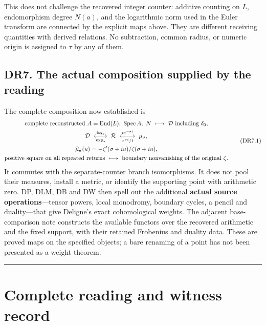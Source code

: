 \documentclass[
]{report}
\begin{document}
This does not challenge the recovered integer counter: additive counting
on \(L\), endomorphism degree \(N(a)\), and the logarithmic norm used in
the Euler transform are connected by the explicit maps above. They are
different receiving quantities with derived relations. No subtraction,
common radius, or numeric origin is assigned to \(\tau\) by any of them.

\section{DR7. The actual composition supplied by the
reading}\label{dr7.-the-actual-composition-supplied-by-the-reading}

The complete composition now established is \[
\begin{gathered}
\text{complete reconstructed }A=\operatorname{End}(L),\ \operatorname{Spec}A,\ N
\ \longmapsto\ \mathcal D\text{ including }\delta_0,\\
\mathcal D\ \xleftrightarrow[\exp_*]{\log_*}\ \mathcal R
\ \xleftrightarrow[e^{\sigma t}/t]{te^{-\sigma t}}\ \mu_\sigma,\\
\widehat\mu_\sigma(u)=-\zeta'(\sigma+iu)/\zeta(\sigma+iu),\\
\text{positive square on all repeated returns}
\ \longmapsto\ \text{boundary nonvanishing of the original }\zeta.
\end{gathered}
\tag{DR7.1}
\] It commutes with the separate-counter branch isomorphisms. It does
not pool their measures, install a metric, or identify the supporting
point with arithmetic zero. DP, DLM, DB and DW then spell out the
additional \textbf{actual source operations}---tensor powers, local
monodromy, boundary cycles, a pencil and duality---that give Deligne's
exact cohomological weights. The adjacent base-comparison note
constructs the available functors over the recovered arithmetic and the
fixed support, with their retained Frobenius and duality data. These are
proved maps on the specified objects; a bare renaming of a point has not
been presented as a weight theorem.

\begin{center}\rule{0.5\linewidth}{0.5pt}\end{center}

\chapter{Complete reading and witness
record}\label{complete-reading-and-witness-record}
\end{document}
